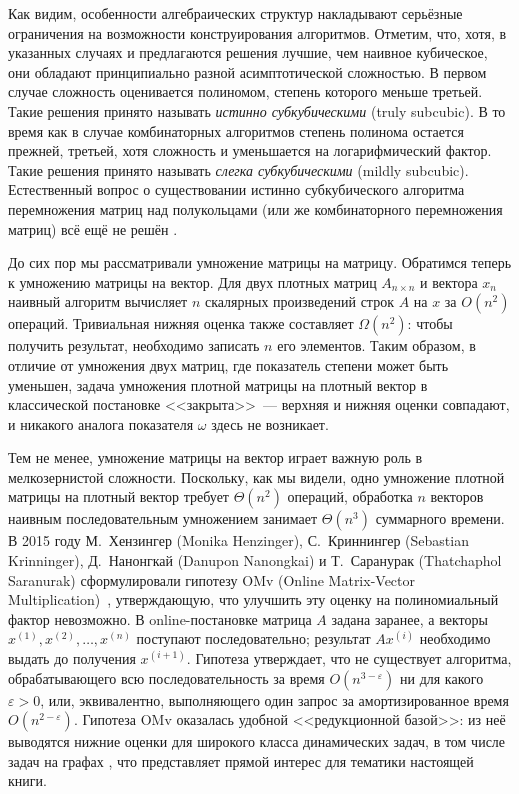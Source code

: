 Как видим, особенности алгебраических структур накладывают серьёзные ограничения на возможности конструирования алгоритмов.
Отметим, что, хотя, в указанных случаях и предлагаются решения лучшие, чем наивное кубическое, они обладают принципиально разной асимптотической сложностью.
В первом случае сложность оценивается полиномом, степень которого меньше третьей.
Такие решения принято называть \emph{истинно субкубическими} (truly subcubic).
В то время как в случае комбинаторных алгоритмов степень полинома остается прежней, третьей, хотя сложность и уменьшается на логарифмический фактор.
Такие решения принято называть \emph{слегка субкубическими} (mildly subcubic).
Естественный вопрос о существовании истинно субкубического алгоритма перемножения матриц над полукольцами (или же комбинаторного перемножения матриц) всё ещё не решён%
.

До сих пор мы рассматривали умножение матрицы на матрицу. Обратимся теперь к умножению матрицы на вектор.
Для двух плотных матриц $A_{n \times n}$ и вектора $x_n$ наивный алгоритм вычисляет $n$ скалярных произведений строк $A$ на $x$ за $O(n^2)$ операций.
Тривиальная нижняя оценка также составляет $\Omega(n^2)$: чтобы получить результат, необходимо записать $n$ его элементов.
Таким образом, в отличие от умножения двух матриц, где показатель степени может быть уменьшен, задача умножения плотной матрицы на плотный вектор в классической постановке <<закрыта>>~--- верхняя и нижняя оценки совпадают, и никакого аналога показателя $\omega$ здесь не возникает.


Тем не менее, умножение матрицы на вектор играет важную роль в мелкозернистой сложности.
Поскольку, как мы видели, одно умножение плотной матрицы на плотный вектор требует $\Theta(n^2)$ операций, обработка $n$ векторов наивным последовательным умножением занимает $\Theta(n^3)$ суммарного времени.
В 2015 году М.~Хензингер (Monika Henzinger), С.~Криннингер (Sebastian Krinninger), Д.~Нанонгкай (Danupon Nanongkai) и Т.~Саранурак (Thatchaphol Saranurak) сформулировали гипотезу OMv (Online Matrix-Vector Multiplication)~, утверждающую, что улучшить эту оценку на полиномиальный фактор невозможно.
В online-постановке матрица $A$ задана заранее, а векторы $x^{(1)}, x^{(2)}, \dots, x^{(n)}$ поступают последовательно; результат $Ax^{(i)}$ необходимо выдать до получения $x^{(i+1)}$.
Гипотеза утверждает, что не существует алгоритма, обрабатывающего всю последовательность за время $O(n^{3-\varepsilon})$ ни для какого $\varepsilon > 0$, или, эквивалентно, выполняющего один запрос за амортизированное время $O(n^{2-\varepsilon})$.
Гипотеза OMv оказалась удобной <<редукционной базой>>: из неё выводятся нижние оценки для широкого класса динамических задач, в том числе задач на графах%
%
, что представляет прямой интерес для тематики настоящей книги.


